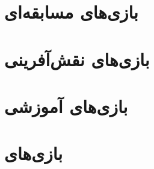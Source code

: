 \subsection[FreeCol]{}

\section{بازی‌های مسابقه‌ای}
\subsection[TORCS]{}
\subsection[Racer Tux]{}

\section{بازی‌های نقش‌آفرینی}
\subsection[Auteria]{}
\subsection[PlaneShift]{}


\section{بازی‌های آموزشی}
\subsection[gbrainy]{}

\section[بازی‌های Steam]{بازی‌های }

